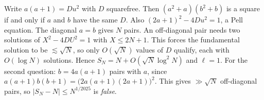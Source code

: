 \documentclass[11pt,a4paper]{article}
\begin{document}
 Write $a(a+1)=Du^2$ with $D$ squarefree. Then $(a^2+a)(b^2+b)$ is a square if and only if $a$ and $b$ have the same $D$. Also $(2a+1)^2-4Du^2=1$, a Pell equation.
 The diagonal $a=b$ gives $N$ pairs. An off-diagonal pair needs two solutions of $X^2-4DU^2=1$ with $X\le2N+1$. This forces the fundamental solution to be $\lesssim\sqrt N$, so only $O(\sqrt N)$ values of $D$ qualify, each with $O(\log N)$ solutions.
 Hence $S_N=N+O(\sqrt N\log^2N)$ and $\ell=1$. For the second question: $b=4a(a+1)$ pairs with $a$, since $a(a+1)b(b+1)=\bigl(2a(a+1)(2a+1)\bigr)^2$. This gives $\gg\sqrt N$ off-diagonal pairs, so $|S_N-N|\le N^{1/2025}$ is \emph{false}.
\end{document}
